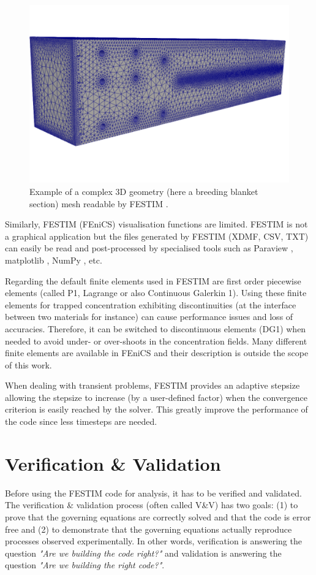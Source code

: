 \begin{figure}
    \centering
    \includegraphics[width=0.5\linewidth]{Figures/Chapter2/example_mesh.png}
    \caption{Example of a complex 3D geometry (here a breeding blanket section) mesh readable by FESTIM \cite{dark_influence_2021}.}
    \label{fig: example mesh}
\end{figure}

Similarly, FESTIM (FEniCS) visualisation functions are limited.
FESTIM is not a graphical application but the files generated by FESTIM (XDMF, CSV, TXT) can easily be read and post-processed by specialised tools such as Paraview , matplotlib , NumPy , etc.

Regarding the default finite elements used in FESTIM are first order piecewise elements (called P1, Lagrange or also Continuous Galerkin 1).
Using these finite elements for trapped concentration exhibiting discontinuities (at the interface between two materials for instance) can cause performance issues and loss of accuracies.
Therefore, it can be switched to discontinuous elements (DG1) when needed to avoid under- or over-shoots in the concentration fields.
Many different finite elements are available in FEniCS \cite{noauthor_periodic_nodate} and their description is outside the scope of this work.

When dealing with transient problems, FESTIM provides an adaptive stepsize allowing the stepsize to increase (by a user-defined factor) when the convergence criterion is easily reached by the solver.
This greatly improve the performance of the code since less timesteps are needed.



\section{Verification \& Validation}

Before using the FESTIM code for analysis, it has to be verified and validated.
The verification \& validation process (often called V\&V) has two goals: (1) to prove that the governing equations are correctly solved and that the code is error free and (2) to demonstrate that the governing equations actually reproduce processes observed experimentally.
In other words, verification is answering the question \textit{"Are we building the code right?"} and validation is answering the question \textit{"Are we building the right code?"}.

